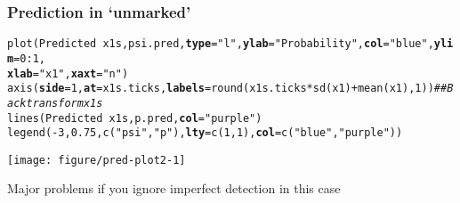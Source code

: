 \documentclass[color=usenames,dvipsnames]{beamer}\usepackage[]{graphicx}\usepackage[]{color}
\makeatletter
\newcommand{\hlnum}[1]{\textcolor[rgb]{0.69,0.494,0}{#1}}%
\newcommand{\hlstr}[1]{\textcolor[rgb]{0.749,0.012,0.012}{#1}}%
\newcommand{\hlcom}[1]{\textcolor[rgb]{0.514,0.506,0.514}{\textit{#1}}}%
\newcommand{\hlopt}[1]{\textcolor[rgb]{0,0,0}{#1}}%
\newcommand{\hlstd}[1]{\textcolor[rgb]{0,0,0}{#1}}%
\newcommand{\hlkwc}[1]{\textcolor[rgb]{0,0,0}{\textbf{#1}}}%
\newcommand{\hlkwd}[1]{\textcolor[rgb]{0.004,0.004,0.506}{#1}}%
\newenvironment{kframe}{%
 \def\at@end@of@kframe{}%
 \ifinner\ifhmode%
  \def\at@end@of@kframe{\end{minipage}}%
  \begin{minipage}{\columnwidth}%
 \fi\fi%
 \def\FrameCommand##1{\hskip\@totalleftmargin \hskip-\fboxsep
 \colorbox{shadecolor}{##1}\hskip-\fboxsep
     \hskip-\linewidth \hskip-\@totalleftmargin \hskip\columnwidth}%
 \MakeFramed {\advance\hsize-\width
   \@totalleftmargin\z@ \linewidth\hsize
   \@setminipage}}%
 {\par\unskip\endMakeFramed%
 \at@end@of@kframe}
\newenvironment{knitrout}{}{} %
\makeatother
\begin{document}
\begin{frame}[fragile]
  \frametitle{Prediction in `unmarked'}
\begin{knitrout}\tiny
{}\color{fgcolor}\begin{kframe}
\begin{alltt}
\hlkwd{plot}\hlstd{(Predicted} \hlopt{~} \hlstd{x1s, psi.pred,} \hlkwc{type}\hlstd{=}\hlstr{"l"}\hlstd{,} \hlkwc{ylab}\hlstd{=}\hlstr{"Probability"}\hlstd{,} \hlkwc{col}\hlstd{=}\hlstr{"blue"}\hlstd{,} \hlkwc{ylim}\hlstd{=}\hlnum{0}\hlopt{:}\hlnum{1}\hlstd{,}
     \hlkwc{xlab}\hlstd{=}\hlstr{"x1"}\hlstd{,} \hlkwc{xaxt}\hlstd{=}\hlstr{"n"}\hlstd{)}
\hlkwd{axis}\hlstd{(}\hlkwc{side}\hlstd{=}\hlnum{1}\hlstd{,} \hlkwc{at}\hlstd{=x1s.ticks,} \hlkwc{labels}\hlstd{=}\hlkwd{round}\hlstd{(x1s.ticks}\hlopt{*}\hlkwd{sd}\hlstd{(x1)}\hlopt{+}\hlkwd{mean}\hlstd{(x1),}\hlnum{1}\hlstd{))} \hlcom{## Backtransform x1s}
\hlkwd{lines}\hlstd{(Predicted} \hlopt{~} \hlstd{x1s, p.pred,} \hlkwc{col}\hlstd{=}\hlstr{"purple"}\hlstd{)}
\hlkwd{legend}\hlstd{(}\hlopt{-}\hlnum{3}\hlstd{,} \hlnum{0.75}\hlstd{,} \hlkwd{c}\hlstd{(}\hlstr{"psi"}\hlstd{,} \hlstr{"p"}\hlstd{),} \hlkwc{lty}\hlstd{=}\hlkwd{c}\hlstd{(}\hlnum{1}\hlstd{,} \hlnum{1}\hlstd{),} \hlkwc{col}\hlstd{=}\hlkwd{c}\hlstd{(}\hlstr{"blue"}\hlstd{,} \hlstr{"purple"}\hlstd{))}
\end{alltt}
\end{kframe}

{\centering \texttt{[image: figure/pred-plot2-1]} 

}



\end{knitrout}
\small
\centering
Major problems if you ignore imperfect detection in this case \\
\end{frame}





\end{document}
